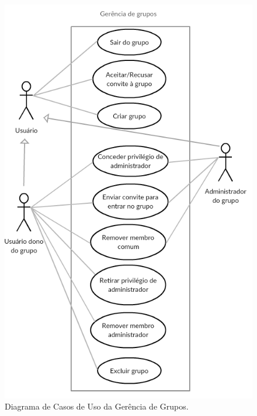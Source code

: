 \documentclass[11pt,a4paper,titlepage]{article}
\begin{document}
\begin{figure}[!htb]
	\centering
	\includegraphics[scale=0.8]{img/casosgrupos.png}
	\caption{Diagrama de Casos de Uso da Gerência de Grupos.}
\end{figure}
\end{document}
